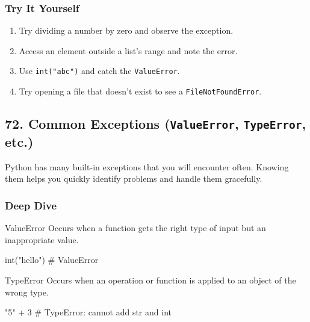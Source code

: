 \documentclass[
  letterpaper,
  DIV=11,
  numbers=noendperiod]{scrreprt}
\newenvironment{Shaded}{\begin{snugshade}}{\end{snugshade}}
\newcommand{\BuiltInTok}[1]{\textcolor[rgb]{0.00,0.23,0.31}{#1}}
\newcommand{\CommentTok}[1]{\textcolor[rgb]{0.37,0.37,0.37}{#1}}
\newcommand{\DecValTok}[1]{\textcolor[rgb]{0.68,0.00,0.00}{#1}}
\newcommand{\NormalTok}[1]{\textcolor[rgb]{0.00,0.23,0.31}{#1}}
\newcommand{\OperatorTok}[1]{\textcolor[rgb]{0.37,0.37,0.37}{#1}}
\newcommand{\StringTok}[1]{\textcolor[rgb]{0.13,0.47,0.30}{#1}}
\providecommand{\tightlist}{%
  \setlength{\itemsep}{0pt}\setlength{\parskip}{0pt}}
\begin{document}
\subsubsection{Try It Yourself}\label{try-it-yourself-70}

\begin{enumerate}
\def\labelenumi{\arabic{enumi}.}
\tightlist
\item
  Try dividing a number by zero and observe the exception.
\item
  Access an element outside a list's range and note the error.
\item
  Use \texttt{int("abc")} and catch the \texttt{ValueError}.
\item
  Try opening a file that doesn't exist to see a
  \texttt{FileNotFoundError}.
\end{enumerate}

\subsection{\texorpdfstring{72. Common Exceptions (\texttt{ValueError},
\texttt{TypeError},
etc.)}{72. Common Exceptions (ValueError, TypeError, etc.)}}\label{common-exceptions-valueerror-typeerror-etc.}

Python has many built-in exceptions that you will encounter often.
Knowing them helps you quickly identify problems and handle them
gracefully.

\subsubsection{Deep Dive}\label{deep-dive-71}

ValueError Occurs when a function gets the right type of input but an
inappropriate value.

\begin{Shaded}
\begin{Highlighting}[]
\BuiltInTok{int}\NormalTok{(}\StringTok{"hello"}\NormalTok{)    }\CommentTok{\# ValueError}
\end{Highlighting}
\end{Shaded}

TypeError Occurs when an operation or function is applied to an object
of the wrong type.

\begin{Shaded}
\begin{Highlighting}[]
\CommentTok{"5"} \OperatorTok{+} \DecValTok{3}   \CommentTok{\# TypeError: cannot add str and int}
\end{Highlighting}
\end{Shaded}
\end{document}
